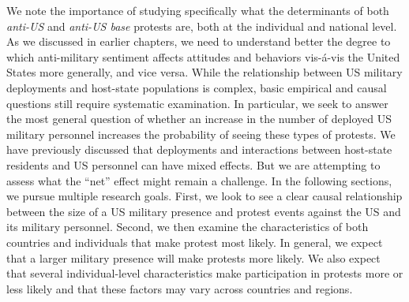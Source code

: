 		We note the importance of studying specifically what the determinants of both \textit {anti-US} and \textit{anti-US base} protests are, both at the individual and national level. As we discussed in earlier chapters, we need to understand better the degree to which anti-military sentiment affects attitudes and behaviors vis-\'{a}-vis the United States more generally, and vice versa. While the relationship between US military deployments and host-state populations is complex, basic empirical and causal questions still require systematic examination. In particular, we seek to answer the most general question of whether an increase in the number of deployed US military personnel increases the probability of seeing these types of protests. We have previously discussed that deployments and interactions between host-state residents and US personnel can have mixed effects. But we are attempting to assess what the ``net'' effect might remain a challenge. In the following sections, we pursue multiple research goals. First, we look to see a clear causal relationship between the size of a US military presence and protest events against the US and its military personnel. Second, we then examine the characteristics of both countries and individuals that make protest most likely. In general, we expect that a larger military presence will make protests more likely. We also expect that several individual-level characteristics make participation in protests more or less likely and that these factors may vary across countries and regions. 
		
		
		
